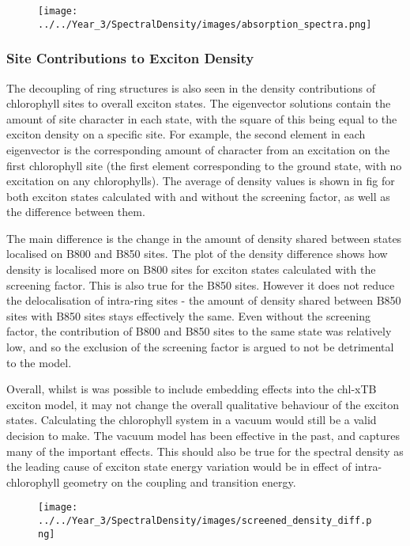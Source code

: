 \begin{figure}
    \centering
    \texttt{[image: ../../Year\_3/SpectralDensity/images/absorption\_spectra.png]}
\end{figure}

\subsubsection{Site Contributions to Exciton Density}
\label{subsubsec:site_dens}

The decoupling of ring structures is also seen in the density contributions of chlorophyll
sites to overall exciton states. The eigenvector solutions contain the amount of
site character in each state, with the square of this being equal to the exciton
density on a specific site. For example, the second element in each eigenvector 
is the corresponding amount of character from an excitation on the first chlorophyll
site (the first element corresponding to the ground state, with no excitation on
any chlorophylls). The average of density values is shown in fig for both exciton
states calculated with and without the screening factor, as well as the difference
between them.

The main difference is the change in the amount of density shared between states
localised on B800 and B850 sites. The plot of the density difference shows how density
is localised more on B800 sites for exciton states calculated with the screening
factor. This is also true for the B850 sites. However it does not reduce the delocalisation
of intra-ring sites - the amount of density shared between B850 sites with B850 
sites stays effectively the same. Even without the screening factor, the contribution
of B800 and B850 sites to the same state was relatively low, and so the exclusion
of the screening factor is argued to not be detrimental to the model.

Overall, whilst is was possible to include embedding effects into the chl-xTB exciton
model, it may not change the overall qualitative behaviour of the exciton states.
Calculating the chlorophyll system in a vacuum would still be a valid decision to
make. The vacuum model has been effective in the past, and captures many of the
important effects. This should also be true for the spectral density as the leading
cause of exciton state energy variation would be in effect of intra-chlorophyll 
geometry on the coupling and transition energy.

\begin{figure}
    \centering
    \texttt{[image: ../../Year\_3/SpectralDensity/images/screened\_density\_diff.png]}
\end{figure}

